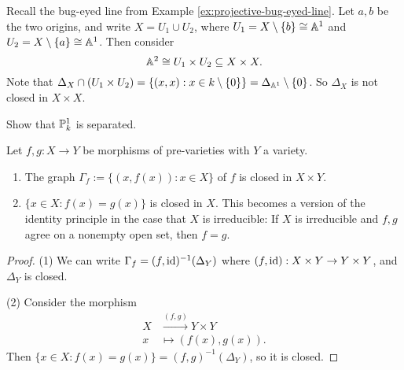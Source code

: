 \begin{example}
  Recall the bug-eyed line from
  Example \ref{ex:projective-bug-eyed-line}.
  Let $a, b$ be the two origins, and
  write
  $X = U_1 \cup U_2$, where
  $U_1 = X \setminus \{b\} \cong \mathbb{A}^1$
  and $U_2 = X \setminus \{a\} \cong \mathbb{A}^1$.
  Then consider
  \[
    \mathbb{A}^2 \cong U_1 \times U_2 \subseteq X \times X.
  \]
  Note that $\Delta_X \cap (U_1 \times U_2) = \{(x, x) : x \in k \setminus \{0\}\} = \Delta_{\mathbb{A}^1} \setminus \{0\}$.
  So $\Delta_X$ is not closed in $X \times X$.
\end{example}

\begin{exercise}
  Show that $\mathbb{P}_k^1$ is separated.
\end{exercise}

\begin{prop}
  Let $f, g : X \to Y$ be morphisms
  of pre-varieties with $Y$ a variety.
  \begin{enumerate}
    \item The graph $\Gamma_f := \{(x, f(x)) : x \in X\}$
      of $f$
      is closed in $X \times Y$.
    \item $\{x \in X : f(x) = g(x)\}$
      is closed in $X$. This becomes a
      version of the identity principle
      in the case that $X$ is irreducible:
      If $X$ is irreducible and
      $f, g$ agree on a nonempty open set,
      then $f = g$.
  \end{enumerate}
\end{prop}

\begin{proof}
  (1) We can write
  $\Gamma_f = (f, \operatorname{id})^{-1}(\Delta_Y)$
  where $(f, \operatorname{id}) : X \times Y \to Y \times Y$,
  and $\Delta_Y$ is closed.

  (2) Consider the morphism
  \begin{align*}
    X &\overset{(f, g)}{\longrightarrow} Y \times Y \\
    x &\longmapsto (f(x), g(x)).
  \end{align*}
  Then $\{x \in X : f(x) = g(x)\} = (f, g)^{-1}(\Delta_Y)$,
  so it is closed.
\end{proof}
